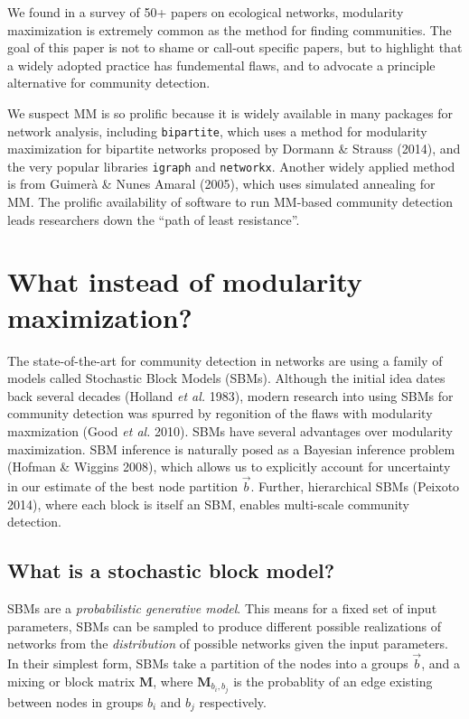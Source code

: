 \documentclass[
]{article}
\begin{document}
We found in a survey of 50+ papers on ecological networks, modularity
maximization is extremely common as the method for finding communities.
The goal of this paper is not to shame or call-out specific papers, but
to highlight that a widely adopted practice has fundemental flaws, and
to advocate a principle alternative for community detection.

We suspect MM is so prolific because it is widely available in many
packages for network analysis, including \texttt{bipartite}, which uses
a method for modularity maximization for bipartite networks proposed by
Dormann \& Strauss (2014), and the very popular libraries
\texttt{igraph} and \texttt{networkx}. Another widely applied method is
from Guimerà \& Nunes Amaral (2005), which uses simulated annealing for
MM. The prolific availability of software to run MM-based community
detection leads researchers down the ``path of least resistance''.

\hypertarget{what-instead-of-modularity-maximization}{%
\section{What instead of modularity
maximization?}\label{what-instead-of-modularity-maximization}}

The state-of-the-art for community detection in networks are using a
family of models called Stochastic Block Models (SBMs). Although the
initial idea dates back several decades (Holland \emph{et al.} 1983),
modern research into using SBMs for community detection was spurred by
regonition of the flaws with modularity maxmization (Good \emph{et al.}
2010). SBMs have several advantages over modularity maximization. SBM
inference is naturally posed as a Bayesian inference problem (Hofman \&
Wiggins 2008), which allows us to explicitly account for uncertainty in
our estimate of the best node partition \(\vec{b}\). Further,
hierarchical SBMs (Peixoto 2014), where each block is itself an SBM,
enables multi-scale community detection.

\hypertarget{what-is-a-stochastic-block-model}{%
\subsection{What is a stochastic block
model?}\label{what-is-a-stochastic-block-model}}

SBMs are a \emph{probabilistic generative model}. This means for a fixed
set of input parameters, SBMs can be sampled to produce different
possible realizations of networks from the \emph{distribution} of
possible networks given the input parameters. In their simplest form,
SBMs take a partition of the nodes into a groups \(\vec{b}\), and a
mixing or block matrix \(\mathbf{M}\), where \(\mathbf{M}_{b_i,b_j}\) is
the probablity of an edge existing between nodes in groups \(b_i\) and
\(b_j\) respectively.
\end{document}
